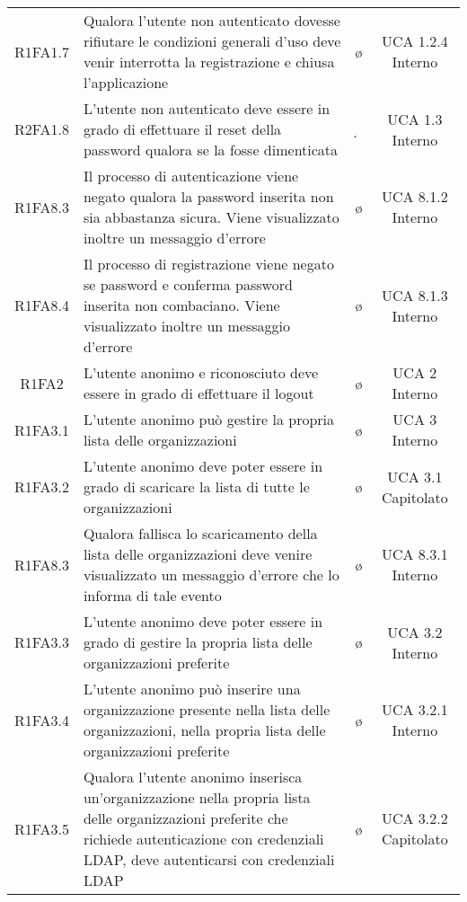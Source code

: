 {\begin{longtable}{ c C{8cm} c c}
R1FA1.7 & Qualora l'utente non autenticato dovesse rifiutare le condizioni generali d'uso deve venir interrotta la registrazione e chiusa l'applicazione & \o & UCA 1.2.4 Interno\\

R2FA1.8 & L'utente non autenticato deve essere in grado di effettuare il reset della password qualora se la fosse dimenticata & \d & UCA 1.3 Interno\\

R1FA8.3 & Il processo di autenticazione viene negato qualora la password inserita non sia abbastanza sicura. Viene visualizzato inoltre un messaggio d'errore & \o & UCA 8.1.2 Interno\\

R1FA8.4 & Il processo di registrazione viene negato se password e conferma password inserita non combaciano. Viene visualizzato inoltre un messaggio d'errore & \o & UCA 8.1.3 Interno\\


R1FA2 & L'utente anonimo e riconosciuto deve essere in grado di effettuare il logout & \o & UCA 2 Interno\\

R1FA3.1 & L'utente anonimo può gestire la propria lista delle organizzazioni& \o & UCA 3 Interno\\

R1FA3.2 & L'utente anonimo deve poter essere in grado di scaricare la lista di tutte le organizzazioni & \o & UCA 3.1 Capitolato \\

R1FA8.3 & Qualora fallisca lo scaricamento della lista delle organizzazioni deve venire visualizzato un messaggio d'errore che lo informa di tale evento & \o & UCA 8.3.1 Interno \\

R1FA3.3 & L’utente anonimo deve poter essere in grado di gestire la propria lista delle organizzazioni preferite & \o & UCA 3.2 Interno \\

R1FA3.4 & L’utente anonimo può inserire una organizzazione presente nella lista delle organizzazioni, nella propria lista delle organizzazioni preferite & \o & UCA 3.2.1 Interno \\

R1FA3.5 & Qualora l’utente anonimo inserisca un'organizzazione nella propria lista delle organizzazioni preferite che richiede autenticazione con credenziali LDAP, deve autenticarsi con credenziali LDAP & \o & UCA 3.2.2 Capitolato\\


\end{longtable}}

